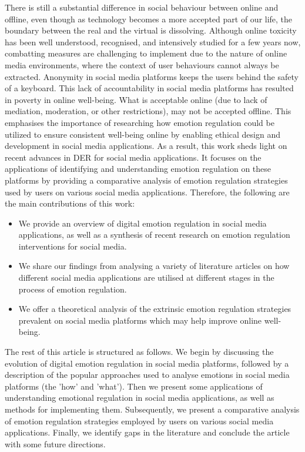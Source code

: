 \documentclass[lettersize,journal]{IEEEtran}
\begin{document}
There is still a substantial difference in social behaviour between online and offline, even though as technology becomes a more accepted part of our life, the boundary between the real and the virtual is dissolving. Although online toxicity has been well understood, recognised, and intensively studied for a few years now, combatting measures are challenging to implement due to the nature of online media environments, where the context of user behaviours cannot always be extracted. Anonymity in social media platforms keeps the users behind the safety of a keyboard. This lack of accountability in social media platforms has resulted in poverty in online well-being. What is acceptable online (due to lack of mediation, moderation, or other restrictions), may not be accepted offline. This emphasises the importance of researching how emotion regulation could be utilized to ensure consistent well-being online by enabling ethical design and development in social media applications. As a result, this work sheds light on recent advances in DER for social media applications. It focuses on the applications of identifying and understanding emotion regulation on these platforms by providing a comparative analysis of emotion regulation strategies used by users on various social media applications. Therefore, the following are the main contributions of this work:
\begin{itemize}
    \item We provide an overview of digital emotion regulation in social media applications, as well as a synthesis of recent research on emotion regulation interventions for social media.
    \item We share our findings from analysing a variety of literature articles on how different social media applications are utilised at different stages in the process of emotion regulation.
    \item We offer a theoretical analysis of the extrinsic emotion regulation strategies prevalent on social media platforms which may help improve online well-being.
\end{itemize}

The rest of this article is structured as follows. We begin by discussing the evolution of digital emotion regulation in social media platforms, followed by a description of the popular approaches used to analyse emotions in social media platforms (the 'how' and 'what'). Then we present some applications of understanding emotional regulation in social media applications, as well as methods for implementing them. Subsequently, we present a comparative analysis of emotion regulation strategies employed by users on various social media applications. Finally, we identify gaps in the literature and conclude the article with some future directions.
\end{document}
